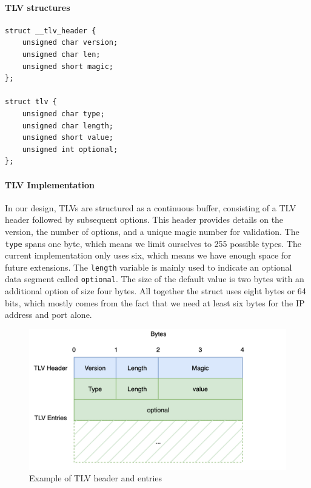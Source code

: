 \documentclass[a4paper,english, 11pt]{report}
\begin{document}
\noindent\begin{minipage}{\linewidth}
\paragraph{TLV structures}
\begin{verbatim}
struct __tlv_header {
    unsigned char version;
    unsigned char len;
    unsigned short magic;
};

struct tlv {
    unsigned char type;
    unsigned char length;
    unsigned short value;
    unsigned int optional;
};
\end{verbatim}
\end{minipage}

\paragraph{TLV Implementation}
In our design, TLVs are structured as a continuous buffer, consisting of a TLV header followed by subsequent options.  This header provides details on the version, the number of options, and a unique magic number for validation. The \verb|type| spans one byte, which means we limit ourselves to 255 possible types. The current implementation only uses six, which means we have enough space for future extensions. The \verb|length| variable is mainly used to indicate an optional data segment called \verb|optional|. The size of the default value is two bytes with an additional option of size four bytes. All together the struct uses eight bytes or 64 bits, which mostly comes from the fact that we need at least six bytes for the IP address and port alone. 


\begin{figure} %
	\centering
	\includegraphics[scale=0.35]{../diagrams/drawio/tlv.png}
  	\caption{Example of TLV header and entries}
  	\label{fig:tlv_example}
\end{figure}
\end{document}
